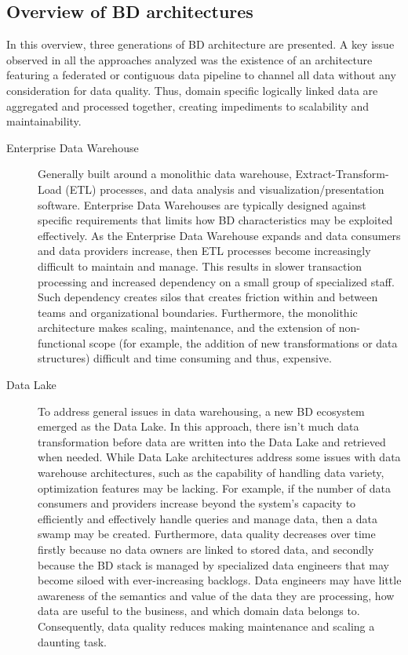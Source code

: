 \documentclass[a4paper,11pt]{article}
\begin{document}
\subsection{Overview of BD architectures}
In this overview, three generations of BD architecture are presented. A key issue observed in all the approaches analyzed was the existence of an architecture featuring a federated or contiguous data pipeline to  channel all data without any consideration for data quality. Thus, domain specific logically linked data are aggregated and processed together, creating impediments to scalability and maintainability.

\begin{description}
    \item[Enterprise Data Warehouse] Generally built around a monolithic data warehouse, Extract-Transform-Load (ETL) processes, and data analysis and visualization/presentation software. Enterprise Data Warehouses are typically designed against specific requirements that limits how BD characteristics may be exploited effectively. As the Enterprise Data Warehouse expands and data consumers and data providers increase, then ETL processes become increasingly difficult to maintain and manage. This results in slower transaction processing and increased dependency on a small group of specialized staff. Such dependency creates silos that creates friction within and between teams and organizational boundaries. Furthermore, the monolithic architecture makes scaling, maintenance, and the extension of non-functional scope (for example, the addition of new transformations or data structures)  difficult and time consuming and thus, expensive.
    \item[Data Lake] To address general issues in data warehousing, a new BD ecosystem emerged as the Data Lake. In this approach, there isn't much data transformation before data are written into the Data Lake and retrieved when needed. While Data Lake architectures address some issues with data warehouse architectures, such as the capability of handling data variety, optimization features may be lacking. For example, if the number of data consumers and providers increase beyond the system's capacity to efficiently and effectively handle queries and manage data, then a data swamp may be created. Furthermore, data quality decreases over time firstly because no data owners are linked to stored data, and secondly because the BD stack is managed by specialized data engineers that may become siloed with ever-increasing backlogs. Data engineers may have little awareness of the semantics and value of the data they are processing, how data are useful to the business, and which domain data belongs to. Consequently, data quality reduces making maintenance and scaling a daunting task. 

\end{description}
\end{document}
